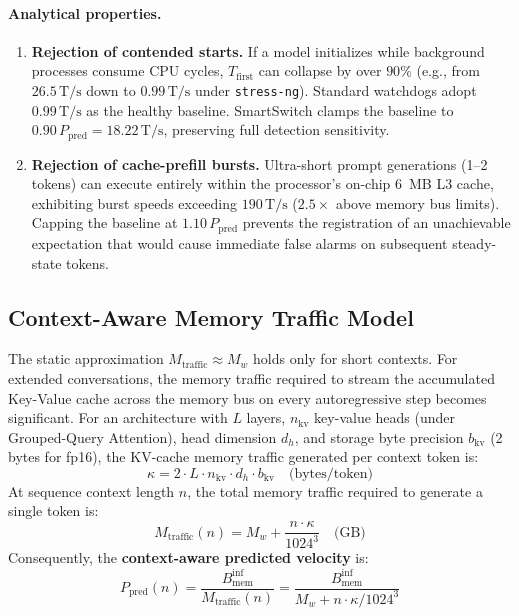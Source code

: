 \documentclass[11pt,a4paper]{article}
\newcommand{\Binf}{B_{\mathrm{mem}}^{\mathrm{inf}}}
\newcommand{\Tfirst}{T_{\mathrm{first}}}
\newcommand{\Ppred}{P_{\mathrm{pred}}}
\newcommand{\Mw}{M_w}
\newcommand{\Ts}{\,\mathrm{T/s}}
\newcommand{\code}[1]{\texttt{#1}}
\begin{document}
\paragraph{Analytical properties.}
\begin{enumerate}[leftmargin=*]
\item \textbf{Rejection of contended starts.} If a model initializes while background processes consume CPU cycles, $\Tfirst$ can collapse by over $90\%$ (e.g., from $26.5\Ts$ down to $0.99\Ts$ under \code{stress-ng}). Standard watchdogs adopt $0.99\Ts$ as the healthy baseline. SmartSwitch clamps the baseline to $0.90\,\Ppred = 18.22\Ts$, preserving full detection sensitivity.
\item \textbf{Rejection of cache-prefill bursts.} Ultra-short prompt generations (1--2 tokens) can execute entirely within the processor's on-chip 6~MB L3 cache, exhibiting burst speeds exceeding $190\Ts$ ($2.5\times$ above memory bus limits). Capping the baseline at $1.10\,\Ppred$ prevents the registration of an unachievable expectation that would cause immediate false alarms on subsequent steady-state tokens.
\end{enumerate}

\subsection{Context-Aware Memory Traffic Model}
The static approximation $M_{\mathrm{traffic}} \approx \Mw$ holds only for short contexts. For extended conversations, the memory traffic required to stream the accumulated Key-Value cache across the memory bus on every autoregressive step becomes significant. For an architecture with $L$ layers, $n_{\mathrm{kv}}$ key-value heads (under Grouped-Query Attention), head dimension $d_h$, and storage byte precision $b_{\mathrm{kv}}$ (2 bytes for fp16), the KV-cache memory traffic generated per context token is:
\begin{equation}\label{eq:kappa}
\kappa = 2 \cdot L \cdot n_{\mathrm{kv}} \cdot d_h \cdot b_{\mathrm{kv}} \quad \text{(bytes/token)}
\end{equation}
At sequence context length $n$, the total memory traffic required to generate a single token is:
\begin{equation}\label{eq:traffic}
M_{\mathrm{traffic}}(n) = \Mw + \frac{n \cdot \kappa}{1024^3} \quad \text{(GB)}
\end{equation}
Consequently, the \textbf{context-aware predicted velocity} is:
\begin{equation}\label{eq:ppredn}
\Ppred(n) = \frac{\Binf}{M_{\mathrm{traffic}}(n)} = \frac{\Binf}{\Mw + n \cdot \kappa / 1024^3}
\end{equation}
\end{document}
